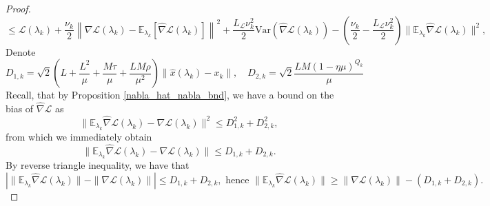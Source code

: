 \documentclass[11pt, twoside]{report}
\begin{document}
\begin{proof}

\begin{equation} \label{Lip_to_sub}
    \leq \mathcal{L}(\lambda_k) + \frac{\nu_k}{2} \left\|\nabla \mathcal{L}(\lambda_k)- \mathbb{E}_{\lambda_k}\left[\widehat{\nabla}\mathcal{L}(\lambda_k)\right]\right\|^2 + \frac{L_{\mathcal{L}}\nu_k^2}{2}\mathrm{Var}(\widehat{\nabla}\mathcal{L}(\lambda_k)) - \left(\frac{\nu_k}{2} - \frac{L_{\mathcal{L}}\nu_k^2}{2}\right) \|\mathbb{E}_{\lambda_k} \widehat{\nabla}\mathcal{L}(\lambda_k)\|^2,
\end{equation}
Denote
\[D_{1,k} = \sqrt{2}\left(L + \frac{L^2}{\mu} + \frac{M\tau}{\mu} + \frac{LM\rho}{\mu^2} \right) \|\hat{x}(\lambda_k) - x_k\|, \quad D_{2,k} = \sqrt{2} \frac{LM(1-\eta \mu)^{Q_k}}{\mu}\]
Recall, that by Proposition \ref{nabla_hat_nabla_bnd}, we have a bound on the bias of $\widehat{\nabla} \mathcal{L}$ as
\begin{equation} \label{T45diff}
    \|\mathbb{E}_{\lambda_k} \widehat{\nabla} \mathcal{L}(\lambda_k) - \nabla \mathcal{L}(\lambda_k)\|^2 \leq D_{1,k}^2  + D_{2,k}^2,
\end{equation}
from which we immediately obtain
\[\|\mathbb{E}_{\lambda_k} \widehat{\nabla} \mathcal{L}(\lambda_k) - \nabla \mathcal{L}(\lambda_k)\| \leq D_{1,k}  + D_{2,k}.\]
By reverse triangle inequality, we have that
\[\left| \|\mathbb{E}_{\lambda_k} \widehat{\nabla} \mathcal{L}(\lambda_k) \| - \|\nabla \mathcal{L}(\lambda_k)\| \right| \leq D_{1,k}+D_{2,k}, \text{ hence } \|\mathbb{E}_{\lambda_k} \widehat{\nabla} \mathcal{L}(\lambda_k) \| \geq \|\nabla \mathcal{L}(\lambda_k)\| -  (D_{1,k}+D_{2,k}).\]


\end{proof}
\end{document}
